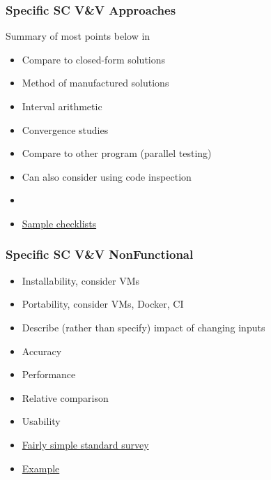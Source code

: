 \documentclass[t,12pt,numbers,fleqn]{beamer}
\begin{document}

\begin{frame}
\frametitle{Specific SC V\&V Approaches}
Summary of most points below in \cite{Smith2016}
\begin{itemize}
\item Compare to closed-form solutions
\item Method of manufactured solutions \cite{Roache1998}
\item Interval arithmetic \cite{Hickey2001}
\item Convergence studies
\item Compare to other program (parallel testing)
\item Can also consider using code inspection
\bi
\item \cite{KellyAndShepard2000,
  ShepardAndKelly2001}
\item \href{http://www.cs.nott.ac.uk/~pszcah/G53QAT/fi.pdf}{Sample checklists}
\ei
\end{itemize}
\end{frame}


\begin{frame}
\frametitle{Specific SC V\&V NonFunctional}

\begin{itemize}
\item Installability, consider VMs
\item Portability, consider VMs, Docker, CI
\item Describe (rather than specify) impact of changing inputs
\bi
\item Accuracy
\item Performance
\item Relative comparison
\ei
\item Usability
\bi
\item \href{https://measuringu.com/sus/}{Fairly simple standard survey}
\item \href{https://gitlab.cas.mcmaster.ca/andrem5/RogueReborn/blob/master/Doc/TestPlan/TestPlan.pdf}{Example}
\ei
\end{itemize}
\end{frame}

\end{document}
